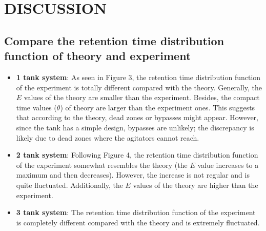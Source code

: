 \section{DISCUSSION}

\subsection{Compare the retention time distribution function of theory and experiment}

\begin{itemize}
    \item \textbf{1 tank system}: As seen in Figure 3, the retention time distribution function of the experiment is totally different compared with the theory. Generally, the $E$ values of the theory are smaller than the experiment. Besides, the compact time values ($\theta$) of theory are larger than the experiment ones. This suggests that according to the theory, dead zones or bypasses might appear. However, since the tank has a simple design, bypasses are unlikely; the discrepancy is likely due to dead zones where the agitators cannot reach.
    
    \item \textbf{2 tank system}: Following Figure 4, the retention time distribution function of the experiment somewhat resembles the theory (the $E$ value increases to a maximum and then decreases). However, the increase is not regular and is quite fluctuated. Additionally, the $E$ values of the theory are higher than the experiment.
    
    \item \textbf{3 tank system}: The retention time distribution function of the experiment is completely different compared with the theory and is extremely fluctuated.
\end{itemize}

